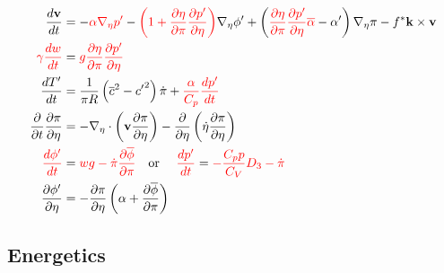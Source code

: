 \documentclass[12pt]{article}
\numberwithin{equation}{section}
\renewcommand{\d}[2]{\frac{d #1}{d #2}}
\newcommand{\dt}[1]{\d{#1}{t}}
\newcommand{\pd}[2]{\frac{\partial #1}{\partial #2}}
\newcommand{\pdt}[1]{\pd{#1}{t}}
\renewcommand{\vec}[1]{\mathbf{#1}}
\newcommand{\grad}[2][\pi]{\nabla_{#1} #2}
\renewcommand{\div}[2][\pi]{\nabla_{#1} \cdot #2}
\begin{document}
\begin{align*}
  \dt{\vec{v}} & = - {\color{red}\alpha \grad[\eta]{p^\prime}} - {\color{red}\left(1 + \pd{\eta}{\pi} \pd{p^\prime}{\eta}\right)} \grad[\eta]{\phi^\prime} + \left({\color{red}\pd{\eta}{\pi} \pd{p^\prime}{\eta} \overline{\alpha}} - \alpha^\prime\right) \grad[\eta]{\pi} - f^* \vec{k} \times \vec{v} \\
  {\color{red}\gamma \dt{w}} & = {\color{red}g \pd{\eta}{\pi} \pd{p^\prime}{\eta}} \\
  \dt{T^\prime} & = \frac{1}{\pi R} \left(\overline{c}^2 - {c^\prime}^2\right) \dot{\pi} + {\color{red}\frac{\alpha}{C_p} \dt{p^\prime}} \\
  \pdt{} \pd{\pi}{\eta} & = - \div[\eta]{\left(\vec{v} \pd{\pi}{\eta}\right)} - \pd{}{\eta} \left(\dot{\eta} \pd{\pi}{\eta}\right) \\
  {\color{red}\dt{\phi^\prime}} & = {\color{red}w g - \dot{\pi} \pd{\overline{\phi}}{\pi}} \text{\quad or \quad} {\color{red}\dt{p^\prime}} = {\color{red}-\frac{C_p p}{C_V} D_3 - \dot{\pi}} \\
  \pd{\phi^\prime}{\eta} & = - \pd{\pi}{\eta} \left(\alpha + \pd{\overline{\phi}}{\pi}\right)
\end{align*}

\subsection{Energetics}
\end{document}
